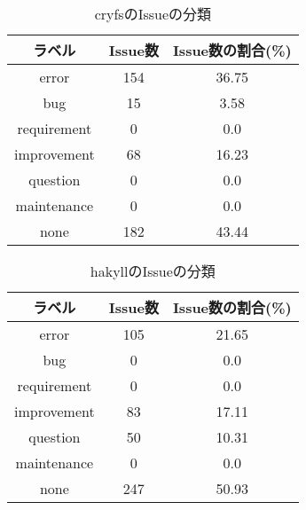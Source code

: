 \begin{table}[p] %
	\centering
	\caption{cryfsのIssueの分類}
	\label{tab:cryfs}
	\begin{tabular}{ccc} %
		\hline
		ラベル      & Issue数 & Issue数の割合(\%) \\\hline
		error       & 154     & 36.75             \\
		bug         & 15      & 3.58              \\
		requirement & 0       & 0.0               \\
		improvement & 68      & 16.23             \\
		question    & 0       & 0.0               \\
		maintenance & 0       & 0.0               \\
		none        & 182     & 43.44             \\\hline
	\end{tabular}
\end{table}


\begin{table}[p] %
	\centering
	\caption{hakyllのIssueの分類}
	\label{tab:hakyll}
	\begin{tabular}{ccc} %
		\hline
		ラベル      & Issue数 & Issue数の割合(\%) \\\hline
		error       & 105     & 21.65             \\
		bug         & 0       & 0.0               \\
		requirement & 0       & 0.0               \\
		improvement & 83      & 17.11             \\
		question    & 50      & 10.31             \\
		maintenance & 0       & 0.0               \\
		none        & 247     & 50.93             \\\hline
	\end{tabular}
\end{table}


